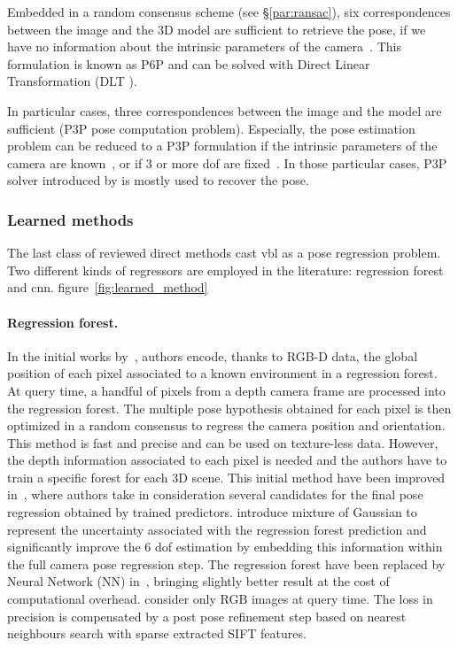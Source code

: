 Embedded in a random consensus scheme (see \S\ref{par:ransac}), six correspondences between the image and the 3D model are sufficient to retrieve the pose, if we have no information about the intrinsic parameters of the camera~\citep{Donoser2014,Li2010,Li2010,Heisterklaus2014}. This formulation is known as P6P and can be solved with Direct Linear Transformation (DLT \citep{Hartley2003}).

In particular cases, three correspondences between the image and the model are sufficient (P3P pose computation problem). Especially, the pose estimation problem can be reduced to a P3P formulation if the intrinsic parameters of the camera are known~\citep{Irschara2009,Middelberg2014}, or if 3 or more \ac{dof} are fixed~\citep{Zeisl2015,Qu2016}. In those particular cases, P3P solver introduced by \citet{Kneip2011} is mostly used to recover the pose. 

\subsubsection{Learned methods}


\label{subsubsec:pose_regression}
The last class of reviewed direct methods cast \ac{vbl} as a pose regression problem. Two different kinds of regressors are employed in the literature: regression forest and \ac{cnn}. figure~\ref{fig:learned_method}

\paragraph{Regression forest.}
In the initial works by~\citet{Shotton2013}, authors encode, thanks to RGB-D data, the global position of each pixel associated to a known environment in a regression forest. At query time, a handful of pixels from a depth camera frame are processed into the regression forest. The multiple pose hypothesis obtained for each pixel is then optimized in a random consensus to regress the camera position and orientation. This method is fast and precise and can be used on texture-less data. However, the depth information associated to each pixel is needed and the authors have to train a specific forest for each 3D scene. This initial method have been improved in~\citep{Guzman-rivera2014}, where authors take in consideration several candidates for the final pose regression obtained by trained predictors. \citet{Valentin2015} introduce mixture of Gaussian to represent the uncertainty associated with the regression forest prediction and significantly improve the 6 \ac{dof} estimation by embedding this information within the full camera pose regression step. The regression forest have been replaced by Neural Network (NN) in~\citep{Massiceti2016}, bringing slightly better result at the cost of computational overhead. \citet{Meng2016} consider only RGB images at query time. The loss in precision is compensated by a post pose refinement step based on nearest neighbours search with sparse extracted SIFT features.

